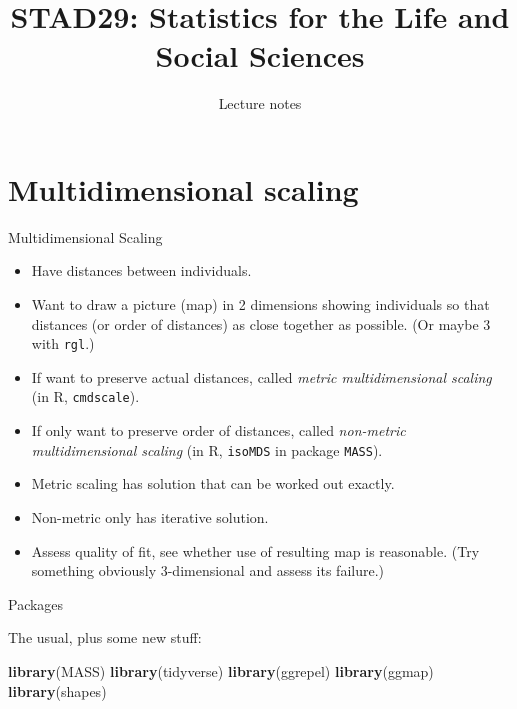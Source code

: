 \documentclass[ignorenonframetext,]{beamer}
\title{STAD29: Statistics for the Life and Social Sciences}
\author{Lecture notes}
\date{}
\newenvironment{Shaded}{\begin{snugshade}}{\end{snugshade}}
\newcommand{\KeywordTok}[1]{\textcolor[rgb]{0.13,0.29,0.53}{\textbf{#1}}}
\newcommand{\NormalTok}[1]{#1}
\begin{document}
\frame{\titlepage}

\hypertarget{multidimensional-scaling}{%
\section{Multidimensional scaling}\label{multidimensional-scaling}}

\begin{frame}[fragile]{Multidimensional Scaling}
\protect\hypertarget{multidimensional-scaling-1}{}

\begin{itemize}
\item
  Have distances between individuals.
\item
  Want to draw a picture (map) in 2 dimensions showing individuals so
  that distances (or order of distances) as close together as possible.
  (Or maybe 3 with \texttt{rgl}.)
\item
  If want to preserve actual distances, called \emph{metric
  multidimensional scaling} (in R, \texttt{cmdscale}).
\item
  If only want to preserve order of distances, called \emph{non-metric
  multidimensional scaling} (in R, \texttt{isoMDS} in package
  \texttt{MASS}).
\item
  Metric scaling has solution that can be worked out exactly.
\item
  Non-metric only has iterative solution.
\item
  Assess quality of fit, see whether use of resulting map is reasonable.
  (Try something obviously 3-dimensional and assess its failure.)
\end{itemize}

\end{frame}

\begin{frame}[fragile]{Packages}
\protect\hypertarget{packages}{}

The usual, plus some new stuff:

\begin{Shaded}
\begin{Highlighting}[]
\KeywordTok{library}\NormalTok{(MASS)}
\KeywordTok{library}\NormalTok{(tidyverse)}
\KeywordTok{library}\NormalTok{(ggrepel)}
\KeywordTok{library}\NormalTok{(ggmap)}
\KeywordTok{library}\NormalTok{(shapes)}
\end{Highlighting}
\end{Shaded}

\end{frame}
\end{document}
